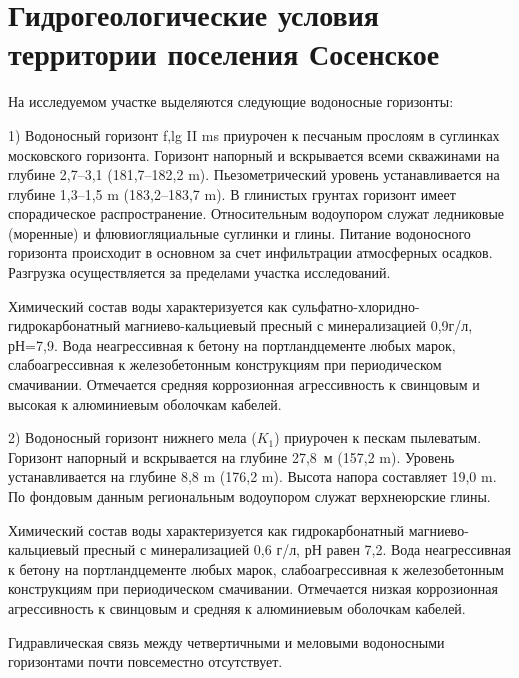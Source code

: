 \chapter{Гидрогеологические условия территории поселения Сосенское}\label{ch:ch4}

На исследуемом участке выделяются следующие водоносные горизонты:

1) Водоносный горизонт f,lg II ms приурочен к песчаным прослоям в суглинках московского горизонта. 
Горизонт напорный и вскрывается всеми скважинами 
на глубине 2,7--3,1 (181,7--182,2 \si{\meter}). 
Пьезометрический уровень устанавливается 
на глубине 1,3--1,5 \si{\meter} (183,2--183,7 \si{\meter}). 
В глинистых грунтах горизонт имеет спорадическое распространение. 
Относительным водоупором служат ледниковые (моренные) 
и флювиогляциальные суглинки и глины. Питание водоносного горизонта 
происходит в основном за счет инфильтрации атмосферных осадков. 
Разгрузка осуществляется за пределами участка исследований.

Химический состав воды характеризуется как сульфатно-хлоридно-гидрокарбонатный 
магниево-кальциевый пресный 
с минерализацией 0,9г/л, рН=7,9. Вода неагрессивная к бетону на 
портландцементе любых марок, слабоагрессивная 
к железобетонным конструкциям при периодическом смачивании. 
Отмечается средняя коррозионная агрессивность 
к свинцовым и высокая к алюминиевым оболочкам кабелей.

2) Водоносный горизонт нижнего мела ($K_1$) приурочен к пескам пылеватым. 
Горизонт напорный и вскрывается 
на глубине 27,8~м (157,2 \si{\meter}). Уровень устанавливается 
на глубине 8,8 \si{\meter} (176,2 \si{\meter}). 
Высота напора составляет 19,0 \si{\meter}. 
По фондовым данным региональным водоупором 
служат верхнеюрские глины.

Химический состав воды характеризуется как гидрокарбонатный магниево-кальциевый 
пресный с минерализацией 0,6 г/л, 
рН равен 7,2. 
Вода неагрессивная к бетону на портландцементе любых марок, 
слабоагрессивная к железобетонным конструкциям 
при периодическом смачивании. Отмечается низкая коррозионная агрессивность 
к свинцовым и средняя к алюминиевым оболочкам кабелей.

Гидравлическая связь между четвертичными и меловыми водоносными горизонтами 
почти повсеместно отсутствует.